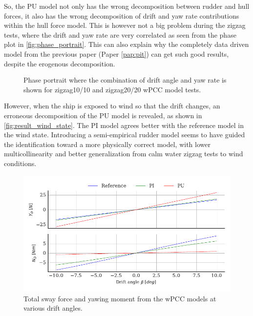 So, the PU model not only has the wrong decomposition between rudder and hull forces, it also has the wrong decomposition of drift and yaw rate contributions within the hull force model. This is however not a big problem during the zigzag tests, where the drift and yaw rate are very correlated as seen from the phase plot in \autoref{fig:phase_portrait}. This can also explain why the completely data driven model from the previous paper (Paper \ref{pap:pit}) can get such good results, despite the erogenous decomposition.
\begin{figure}[h]
  \centering
  
  \caption{Phase portrait where the combination of drift angle and yaw rate is shown for zigzag10/10 and zigzag20/20 wPCC model tests.}
  \label{fig:phase_portrait}
\end{figure}
However, when the ship is exposed to wind so that the drift changes, an erroneous decomposition of the PU model is revealed, as shown in \autoref{fig:result_wind_state}. The PI model agrees better with the reference model in the wind state. Introducing a semi-empirical rudder model seems to have guided the identification toward a more physically correct model, with lower multicollinearity and better generalization from calm water zigzag tests to wind conditions.
\begin{figure}[h!]
    \includegraphics{kappa/images/result_wind_state.forces.pdf}
    \caption{Total sway force and yawing moment from the wPCC models at various drift angles.}
    \label{fig:result_wind_state}
\end{figure}

\FloatBarrier
\clearpage